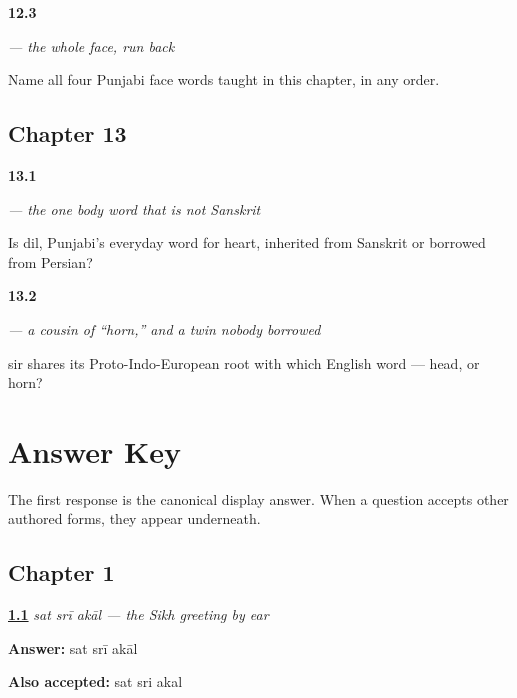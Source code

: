 \noindent\begin{minipage}[t]{\linewidth}
\raggedright
\hypertarget{review-PA-C12-nakk-face}{\textbf{12.3}} \emph{ — the whole face, run back}\par
\small Name all four Punjabi face words taught in this chapter, in any order.
\end{minipage}\par\medskip

\section*{Chapter 13}

\noindent\begin{minipage}[t]{\linewidth}
\raggedright
\hypertarget{review-PA-C13-dil-source}{\textbf{13.1}} \emph{ — the one body word that is not Sanskrit}\par
\small Is dil, Punjabi's everyday word for heart, inherited from Sanskrit or borrowed from Persian?
\end{minipage}\par\medskip

\noindent\begin{minipage}[t]{\linewidth}
\raggedright
\hypertarget{review-PA-C13-sir-cousin}{\textbf{13.2}} \emph{ — a cousin of \textquotedblleft{}horn,\textquotedblright{} and a twin nobody borrowed}\par
\small sir shares its Proto-Indo-European root with which English word — head, or horn?
\end{minipage}\par\medskip

\chapter*{Answer Key}

The first response is the canonical display answer. When a question accepts other authored forms, they appear underneath.

\section*{Chapter 1}

\noindent\begin{minipage}[t]{\linewidth}
\raggedright
\hyperlink{review-PA-C01-sat-sri-akal-return}{\textbf{1.1}} \emph{\emph{sat srī akāl} — the Sikh greeting by ear}\par
\small \textbf{Answer:} sat srī akāl\par
\footnotesize \textbf{Also accepted:} sat sri akal
\end{minipage}\par\medskip

